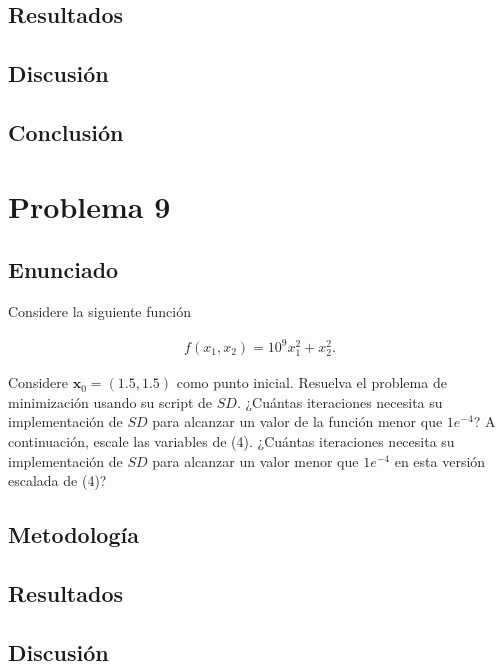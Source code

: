 \documentclass{article}
\begin{document}
\subsection{Resultados}
\setcounter{equation}{0}

\subsection{Discusión}

\subsection{Conclusión}

\section{Problema 9}

\subsection{Enunciado}
Considere la siguiente función

\begin{align}
    f(x_1, x_2) = 10^{9}x_1^{2} + x_2^{2}. \tag{4}
\end{align}

Considere $\mathbf{x}_0 = (1.5, 1.5)$ como punto inicial. Resuelva el problema de minimización usando su script de $SD$. ¿Cuántas iteraciones necesita su implementación de $SD$ para alcanzar un valor de la función menor que $1e^{-4}$? A continuación, escale las variables de (4). ¿Cuántas iteraciones necesita su implementación de $SD$ para alcanzar un valor menor que $1e^{-4}$ en esta versión escalada de (4)?


\subsection{Metodología}

\subsection{Resultados}
\setcounter{equation}{0}

\subsection{Discusión}
\end{document}
